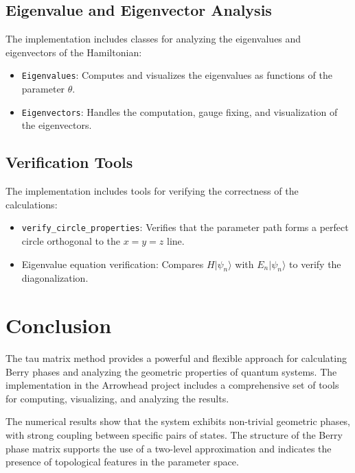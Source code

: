 \documentclass{article}
\begin{document}
\subsection{Eigenvalue and Eigenvector Analysis}

The implementation includes classes for analyzing the eigenvalues and eigenvectors of the Hamiltonian:

\begin{itemize}
    \item \texttt{Eigenvalues}: Computes and visualizes the eigenvalues as functions of the parameter $\theta$.
    
    \item \texttt{Eigenvectors}: Handles the computation, gauge fixing, and visualization of the eigenvectors.
\end{itemize}

\subsection{Verification Tools}

The implementation includes tools for verifying the correctness of the calculations:

\begin{itemize}
    \item \texttt{verify\_circle\_properties}: Verifies that the parameter path forms a perfect circle orthogonal to the $x=y=z$ line.
    
    \item Eigenvalue equation verification: Compares $H|\psi_n\rangle$ with $E_n|\psi_n\rangle$ to verify the diagonalization.
\end{itemize}

\section{Conclusion}

The tau matrix method provides a powerful and flexible approach for calculating Berry phases and analyzing the geometric properties of quantum systems. The implementation in the Arrowhead project includes a comprehensive set of tools for computing, visualizing, and analyzing the results.

The numerical results show that the system exhibits non-trivial geometric phases, with strong coupling between specific pairs of states. The structure of the Berry phase matrix supports the use of a two-level approximation and indicates the presence of topological features in the parameter space.
\end{document}
